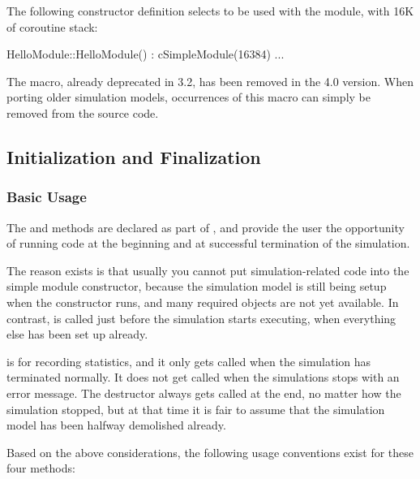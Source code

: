 The following constructor definition selects  to be used
with the module, with 16K of coroutine stack:

\begin{cpp}
HelloModule::HelloModule() : cSimpleModule(16384) {...}
\end{cpp}

\begin{note}
    The  macro, already deprecated in {\opp} 3.2,
    has been removed in the 4.0 version. When porting older simulation models,
    occurrences of this macro can simply be removed from the source code.
\end{note}


\subsection{Initialization and Finalization}
\label{sec:simple-modules:initialize-and-finish}

\subsubsection{Basic Usage}

The  and  methods are declared
as part of , and provide the user the opportunity
of running code at the beginning and at successful termination of the
simulation.

The reason  exists is that usually you cannot put
simulation-related code into the simple module
constructor, because the simulation model is still
being setup when the constructor runs, and many required objects are not yet
available. In contrast,  is called just before the
simulation starts executing, when everything else has been set up
already.

 is for recording statistics, and it only gets called
when the simulation has terminated normally. It does not get called when
the simulations stops with an error message. The destructor always
gets called at the end, no matter how the simulation stopped, but
at that time it is fair to assume that the simulation model has been
halfway demolished already.

Based on the above considerations, the following usage conventions exist
for these four methods:

